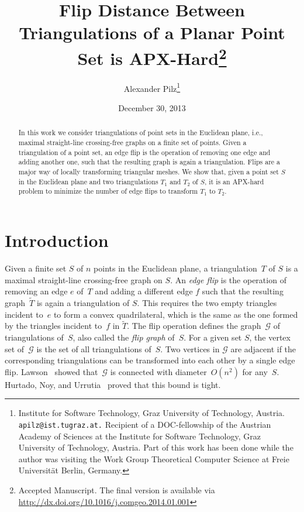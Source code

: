\documentclass[11pt,a4paper]{article}
\title{Flip Distance Between Triangulations of a Planar Point Set is APX-Hard\thanks{Accepted Manuscript. The final version is available via \protect\url{http://dx.doi.org/10.1016/j.comgeo.2014.01.001}}}
\author{Alexander Pilz\thanks{\ifarxiv
Institute for Software Technology, Graz University of Technology, Austria.
\texttt{apilz@ist.tugraz.at.}
\else
\fi
Recipient of a DOC-fellowship of the Austrian Academy of Sciences at the Institute for Software Technology, Graz University of Technology, Austria. Part of this work has been done while the author was visiting the Work Group Theoretical Computer Science at Freie Universit\"at Berlin, Germany.}}
\date{December 30, 2013}
\begin{document}
\maketitle

\begin{abstract}
In this work we consider triangulations of point sets in the Euclidean plane, i.e., maximal straight-line crossing-free graphs on a finite set of points.
Given a triangulation of a point set, an edge flip is the operation of removing one edge and adding another one, such that the resulting graph is again a triangulation.
Flips are a major way of locally transforming triangular meshes.
We show that, given a point set $S$ in the Euclidean plane and two triangulations $T_1$ and $T_2$ of $S$,
it is an APX-hard problem to minimize the number of edge flips to transform $T_1$ to $T_2$.
\end{abstract}

\section{Introduction}
Given a finite set $S$ of $n$ points in the Euclidean plane, a triangulation~$T$ of $S$ is a maximal straight-line crossing-free graph on $S$.
An \emph{edge flip} is the operation of removing an edge $e$ of~$T$ and adding a different edge $f$ such that the resulting graph~$\tilde T$ is again a triangulation of $S$.
This requires the two empty triangles incident to~$e$ to form a convex quadrilateral, which is the same as the one formed by the triangles incident to~$f$ in $\tilde T$.
The flip operation defines the graph~$\mathcal{G}$ of triangulations of~$S$, also called the \emph{flip graph} of~$S$.
For a given set $S$, the vertex set of~$\mathcal{G}$ is the set of all triangulations of~$S$.
Two vertices in $\mathcal{G}$ are adjacent if the corresponding triangulations can be transformed into each other by a single edge flip.
Lawson~\cite{lawson_connected} showed that~$\mathcal{G}$ is connected with diameter~$O(n^2)$ for any~$S$.
Hurtado, Noy, and Urrutia~\cite{hurtado_noy_urrutia} proved that this bound is tight.
\end{document}
